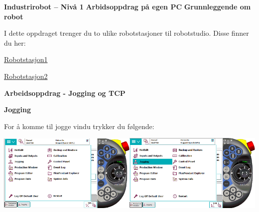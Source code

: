 

\noindent

\vskip 5pt

\vskip 5pt
\begin{center}
\vskip 5pt 
\textbf{Industrirobot -- Nivå 1 }
\vskip 5pt 
\textbf{Arbidsoppdrag på egen PC}
\vskip 5pt 
\textbf{Grunnleggende om robot}
\end{center}

\vskip 5pt 
I dette oppdraget trenger du to ulike robotstasjoner til robotstudio. Disse finner du her:

\vskip 5pt 
\href{https://rfka-my.sharepoint.com/:u:/r/personal/fred-olav_mosdal_skole_rogfk_no/Documents/ForAutofaget.no/Robotstasjon1.rspag?csf=1&web=1&e=Zm7EG9}{Robotstasjon1}

\vskip 5pt 
\href{https://rfka-my.sharepoint.com/:u:/r/personal/fred-olav_mosdal_skole_rogfk_no/Documents/ForAutofaget.no/Robotstasjon2.rspag?csf=1&web=1&e=kk7j4H}{Robotstasjon2}

\vskip 5pt 
\textbf{Arbeidsoppdrag - Jogging og TCP}

\textbf{Jogging}

\vspace{1cm}

For å komme til jogge vindu trykker du følgende:

\vspace{1cm}

\includegraphics[width=0.5\textwidth]{i04861x01}\includegraphics[width=0.5\textwidth]{i04861x02}

